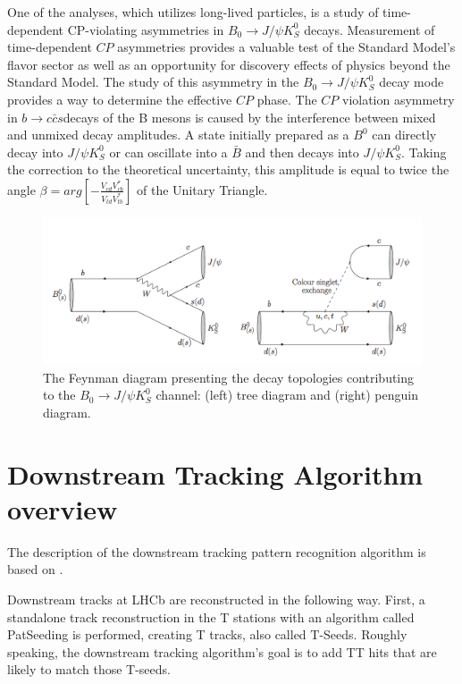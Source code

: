 One of the analyses, which utilizes long-lived particles, is a study of time-dependent CP-violating asymmetries in $B_0 \rightarrow J/\psi K_S^0 $ decays. Measurement of time-dependent $CP$ asymmetries provides a valuable test of the Standard Model's flavor sector as well as an opportunity for discovery effects of physics beyond the Standard Model.  
 The study of this asymmetry in the $B_0 \rightarrow J/\psi K_S^0 $  decay mode provides a way to determine the effective $CP$ phase. The $CP$ violation asymmetry in $b \rightarrow c\bar{c}s$decays of the B mesons is caused by the interference between mixed and unmixed decay amplitudes.
 A state initially prepared as a $B^0$ can directly decay into $J/\psi K_S^0$ or can oscillate into a $\bar{B}$ and then decays into  $J/\psi K_S^0$. Taking the correction to the theoretical uncertainty, this amplitude is equal to twice the angle $\beta = arg [ -  \frac{V_{cd}V_{cb}^*}{V_{td}V_{tb}^*} ] $ of the Unitary Triangle. 

\begin{figure}[h]
\centering
\includegraphics[width=\textwidth]{figures/B0JPKs.png}
\caption{The Feynman diagram presenting the decay topologies contributing to the $B_0 \rightarrow J/\psi K_S^0 $ channel:  (left) tree diagram and (right) penguin diagram.
\label{fig:BJPSi}}
\end{figure}

\section{Downstream Tracking Algorithm overview}
\label{Sec:Downstrean Overview}
The description of the downstream tracking pattern recognition algorithm is based on \cite{patllt}. 

Downstream tracks at LHCb are reconstructed in the following way. First, a standalone track reconstruction in the T stations with an algorithm called PatSeeding is performed, creating T tracks, also called T-Seeds. 
Roughly speaking, the downstream tracking algorithm's goal is to add TT hits that are likely to match those T-seeds. 

